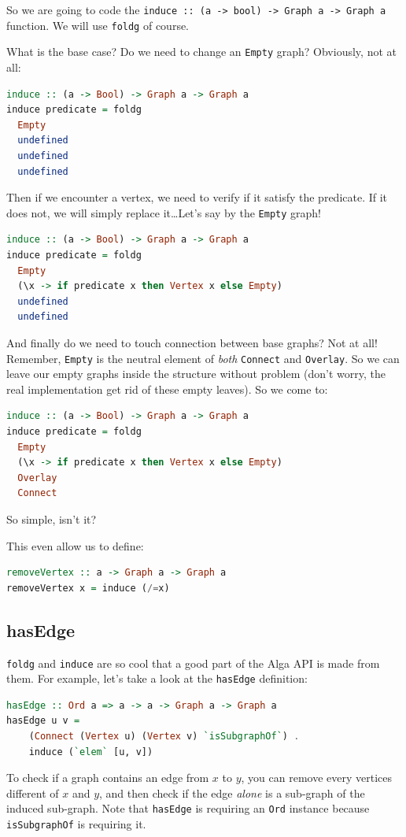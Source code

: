 \documentclass[10pt,a4paper]{article}
\begin{document}
So we are going to code the \verb|induce :: (a -> bool) -> Graph a -> Graph a| function. We will use \verb|foldg| of course.

What is the base case? Do we need to change an \verb|Empty| graph? Obviously, not at all:

\begin{lstlisting}[language=Haskell, frame=single]
induce :: (a -> Bool) -> Graph a -> Graph a
induce predicate = foldg
  Empty
  undefined
  undefined
  undefined
\end{lstlisting}

Then if we encounter a vertex, we need to verify if it satisfy the predicate. If it does not, we will simply replace it\ldots  Let's say by the \verb|Empty| graph!

\begin{lstlisting}[language=Haskell, frame=single]
induce :: (a -> Bool) -> Graph a -> Graph a
induce predicate = foldg
  Empty
  (\x -> if predicate x then Vertex x else Empty)
  undefined
  undefined
\end{lstlisting}

And finally do we need to touch connection between base graphs? Not at all! Remember, \verb|Empty| is the neutral element of \emph{both} \verb|Connect| and \verb|Overlay|. So we can leave our empty graphs inside the structure without problem (don't worry, the real implementation get rid of these empty leaves). So we come to:

\begin{lstlisting}[language=Haskell, frame=single]
induce :: (a -> Bool) -> Graph a -> Graph a
induce predicate = foldg
  Empty
  (\x -> if predicate x then Vertex x else Empty)
  Overlay
  Connect
\end{lstlisting}

So simple, isn't it?

This even allow us to define:

\begin{lstlisting}[language=Haskell, frame=single]
removeVertex :: a -> Graph a -> Graph a
removeVertex x = induce (/=x)
\end{lstlisting}

\subsection{hasEdge}
\verb|foldg| and \verb|induce| are so cool that a good part of the Alga API is made from them. For example, let's take a look at the \verb|hasEdge| definition:
\begin{lstlisting}[language=Haskell, frame=single]
hasEdge :: Ord a => a -> a -> Graph a -> Graph a
hasEdge u v =
	(Connect (Vertex u) (Vertex v) `isSubgraphOf`) .
	induce (`elem` [u, v])
\end{lstlisting}
To check if a graph contains an edge from $x$ to $y$, you can remove every vertices different of $x$ and $y$, and then check if the edge \emph{alone} is a sub-graph of the induced sub-graph.
Note that \verb|hasEdge| is requiring an \verb|Ord| instance because \verb|isSubgraphOf| is requiring it.
\end{document}
